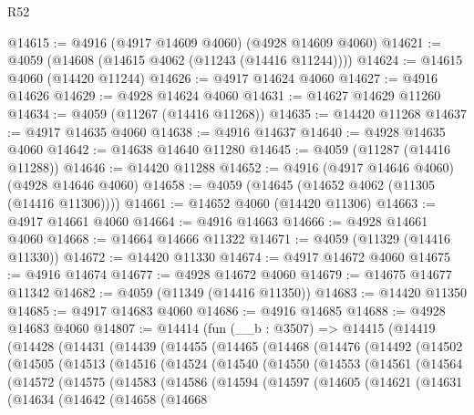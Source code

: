 \begin{lexlean}{R52}
\begin{coremodule}
@14615 := @4916 (@4917 @14609 @4060) (@4928 @14609 @4060)
@14621 := @4059 (@14608 (@14615 @4062 (@11243 (@14416 @11244))))
@14624 := @14615 @4060 (@14420 @11244)
@14626 := @4917 @14624 @4060
@14627 := @4916 @14626
@14629 := @4928 @14624 @4060
@14631 := @14627 @14629 @11260
@14634 := @4059 (@11267 (@14416 @11268))
@14635 := @14420 @11268
@14637 := @4917 @14635 @4060
@14638 := @4916 @14637
@14640 := @4928 @14635 @4060
@14642 := @14638 @14640 @11280
@14645 := @4059 (@11287 (@14416 @11288))
@14646 := @14420 @11288
@14652 := @4916 (@4917 @14646 @4060) (@4928 @14646 @4060)
@14658 := @4059 (@14645 (@14652 @4062 (@11305 (@14416 @11306))))
@14661 := @14652 @4060 (@14420 @11306)
@14663 := @4917 @14661 @4060
@14664 := @4916 @14663
@14666 := @4928 @14661 @4060
@14668 := @14664 @14666 @11322
@14671 := @4059 (@11329 (@14416 @11330))
@14672 := @14420 @11330
@14674 := @4917 @14672 @4060
@14675 := @4916 @14674
@14677 := @4928 @14672 @4060
@14679 := @14675 @14677 @11342
@14682 := @4059 (@11349 (@14416 @11350))
@14683 := @14420 @11350
@14685 := @4917 @14683 @4060
@14686 := @4916 @14685
@14688 := @4928 @14683 @4060
@14807 := @14414
    (fun (__b : @3507) =>
    @14415
      (@14419
        (@14428
          (@14431
            (@14439
              (@14455
                (@14465
                  (@14468
                    (@14476
                      (@14492
                        (@14502
                          (@14505
                            (@14513
                              (@14516
                                (@14524
                                  (@14540
                                    (@14550
                                      (@14553
                                        (@14561
                                          (@14564
                                            (@14572
                                              (@14575
                                                (@14583
                                                  (@14586
                                                    (@14594
                                                      (@14597
                                                        (@14605
                                                          (@14621
                                                            (@14631
                                                              (@14634
                                                                (@14642
                                                                  (@14658
                                                                    (@14668

\end{coremodule}
\end{lexlean}

